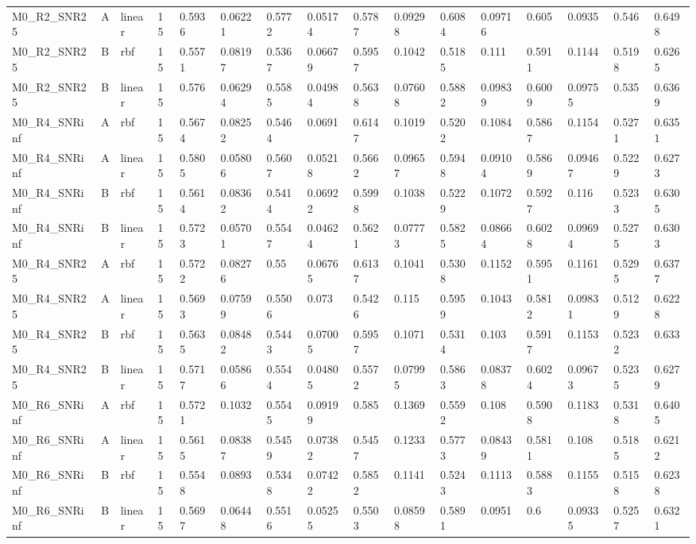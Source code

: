 \begin{tabular}{llllllllllllllll}
M0\_R2\_SNR25 & A & linear & 15 & 0.5936 & 0.06221 & 0.5772 & 0.05174 & 0.5787 & 0.09298 & 0.6084 & 0.09716 & 0.605 & 0.0935 & 0.546 & 0.6498 \\
M0\_R2\_SNR25 & B & rbf & 15 & 0.5571 & 0.08197 & 0.5367 & 0.06679 & 0.5957 & 0.1042 & 0.5185 & 0.111 & 0.5911 & 0.1144 & 0.5198 & 0.6265 \\
M0\_R2\_SNR25 & B & linear & 15 & 0.576 & 0.06294 & 0.5585 & 0.04984 & 0.5638 & 0.07608 & 0.5882 & 0.09839 & 0.6009 & 0.09755 & 0.535 & 0.6369 \\
M0\_R4\_SNRinf & A & rbf & 15 & 0.5674 & 0.08252 & 0.5464 & 0.0691 & 0.6147 & 0.1019 & 0.5202 & 0.1084 & 0.5867 & 0.1154 & 0.5271 & 0.6351 \\
M0\_R4\_SNRinf & A & linear & 15 & 0.5805 & 0.05806 & 0.5607 & 0.05218 & 0.5662 & 0.09657 & 0.5948 & 0.09104 & 0.5869 & 0.09467 & 0.5229 & 0.6273 \\
M0\_R4\_SNRinf & B & rbf & 15 & 0.5614 & 0.08362 & 0.5414 & 0.06922 & 0.5998 & 0.1038 & 0.5229 & 0.1072 & 0.5927 & 0.116 & 0.5233 & 0.6305 \\
M0\_R4\_SNRinf & B & linear & 15 & 0.5723 & 0.05701 & 0.5547 & 0.04624 & 0.5621 & 0.07773 & 0.5825 & 0.08664 & 0.6028 & 0.09694 & 0.5275 & 0.6303 \\
M0\_R4\_SNR25 & A & rbf & 15 & 0.5722 & 0.08276 & 0.55 & 0.06765 & 0.6137 & 0.1041 & 0.5308 & 0.1152 & 0.5951 & 0.1161 & 0.5295 & 0.6377 \\
M0\_R4\_SNR25 & A & linear & 15 & 0.5693 & 0.07599 & 0.5506 & 0.073 & 0.5426 & 0.115 & 0.5959 & 0.1043 & 0.5812 & 0.09831 & 0.5129 & 0.6228 \\
M0\_R4\_SNR25 & B & rbf & 15 & 0.5635 & 0.08482 & 0.5443 & 0.07005 & 0.5957 & 0.1071 & 0.5314 & 0.103 & 0.5917 & 0.1153 & 0.5232 & 0.633 \\
M0\_R4\_SNR25 & B & linear & 15 & 0.5717 & 0.05866 & 0.5544 & 0.04805 & 0.5572 & 0.07995 & 0.5863 & 0.08378 & 0.6024 & 0.09673 & 0.5235 & 0.6279 \\
M0\_R6\_SNRinf & A & rbf & 15 & 0.5721 & 0.1032 & 0.5545 & 0.09199 & 0.585 & 0.1369 & 0.5592 & 0.108 & 0.5908 & 0.1183 & 0.5318 & 0.6405 \\
M0\_R6\_SNRinf & A & linear & 15 & 0.5615 & 0.08387 & 0.5459 & 0.07382 & 0.5457 & 0.1233 & 0.5773 & 0.08439 & 0.5811 & 0.108 & 0.5185 & 0.6212 \\
M0\_R6\_SNRinf & B & rbf & 15 & 0.5548 & 0.0893 & 0.5348 & 0.07422 & 0.5852 & 0.1141 & 0.5243 & 0.1113 & 0.5883 & 0.1155 & 0.5158 & 0.6238 \\
M0\_R6\_SNRinf & B & linear & 15 & 0.5697 & 0.06448 & 0.5516 & 0.05255 & 0.5503 & 0.08598 & 0.5891 & 0.0951 & 0.6 & 0.09335 & 0.5257 & 0.6321 \\

\end{tabular}
